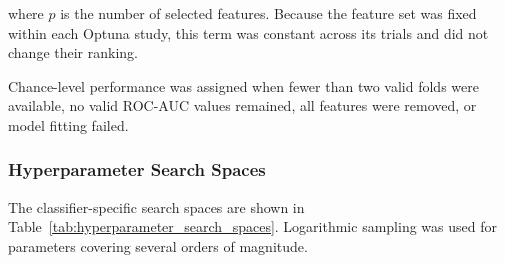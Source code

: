 \documentclass[12pt,twocolumn]{article}
\begin{document}
where \(p\) is the number of selected features. Because the feature set
was fixed within each Optuna study, this term was constant across its
trials and did not change their ranking.

Chance-level performance was assigned when fewer than two valid folds
were available, no valid ROC-AUC values remained, all features were
removed, or model fitting failed.

\subsubsection{Hyperparameter Search Spaces}
\label{subsubsec:hyperparameter_search_spaces}

The classifier-specific search spaces are shown in
Table~\ref{tab:hyperparameter_search_spaces}. Logarithmic sampling was
used for parameters covering several orders of magnitude.
\end{document}
